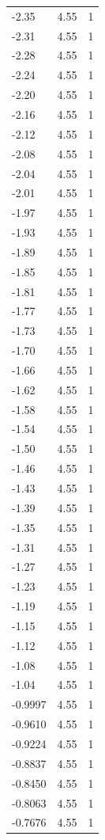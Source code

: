 \begin{longtable}{lrr}
  -2.35 & 4.55 & 1 \\
  -2.31 & 4.55 & 1 \\
  -2.28 & 4.55 & 1 \\
  -2.24 & 4.55 & 1 \\
  -2.20 & 4.55 & 1 \\
  -2.16 & 4.55 & 1 \\
  -2.12 & 4.55 & 1 \\
  -2.08 & 4.55 & 1 \\
  -2.04 & 4.55 & 1 \\
  -2.01 & 4.55 & 1 \\
  -1.97 & 4.55 & 1 \\
  -1.93 & 4.55 & 1 \\
  -1.89 & 4.55 & 1 \\
  -1.85 & 4.55 & 1 \\
  -1.81 & 4.55 & 1 \\
  -1.77 & 4.55 & 1 \\
  -1.73 & 4.55 & 1 \\
  -1.70 & 4.55 & 1 \\
  -1.66 & 4.55 & 1 \\
  -1.62 & 4.55 & 1 \\
  -1.58 & 4.55 & 1 \\
  -1.54 & 4.55 & 1 \\
  -1.50 & 4.55 & 1 \\
  -1.46 & 4.55 & 1 \\
  -1.43 & 4.55 & 1 \\
  -1.39 & 4.55 & 1 \\
  -1.35 & 4.55 & 1 \\
  -1.31 & 4.55 & 1 \\
  -1.27 & 4.55 & 1 \\
  -1.23 & 4.55 & 1 \\
  -1.19 & 4.55 & 1 \\
  -1.15 & 4.55 & 1 \\
  -1.12 & 4.55 & 1 \\
  -1.08 & 4.55 & 1 \\
  -1.04 & 4.55 & 1 \\
  -0.9997 & 4.55 & 1 \\
  -0.9610 & 4.55 & 1 \\
  -0.9224 & 4.55 & 1 \\
  -0.8837 & 4.55 & 1 \\
  -0.8450 & 4.55 & 1 \\
  -0.8063 & 4.55 & 1 \\
  -0.7676 & 4.55 & 1 \\

\end{longtable}
